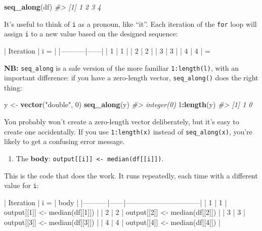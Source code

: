 \documentclass[]{book}
\newenvironment{Shaded}{\begin{snugshade}}{\end{snugshade}}
\newcommand{\CommentTok}[1]{\textcolor[rgb]{0.56,0.35,0.01}{\textit{#1}}}
\newcommand{\DecValTok}[1]{\textcolor[rgb]{0.00,0.00,0.81}{#1}}
\newcommand{\KeywordTok}[1]{\textcolor[rgb]{0.13,0.29,0.53}{\textbf{#1}}}
\newcommand{\NormalTok}[1]{#1}
\newcommand{\OperatorTok}[1]{\textcolor[rgb]{0.81,0.36,0.00}{\textbf{#1}}}
\newcommand{\StringTok}[1]{\textcolor[rgb]{0.31,0.60,0.02}{#1}}
\providecommand{\tightlist}{%
  \setlength{\itemsep}{0pt}\setlength{\parskip}{0pt}}
\begin{document}
\begin{Shaded}
\begin{Highlighting}[]
\KeywordTok{seq_along}\NormalTok{(df)}
\CommentTok{#> [1] 1 2 3 4}
\end{Highlighting}
\end{Shaded}

It's useful to think of \texttt{i} as a pronoun, like ``it''. Each iteration of the \texttt{for} loop will assign \texttt{i} to a new value based on the designed sequence:

\begin{Shaded}
\begin{Highlighting}[]
\NormalTok{| Iteration | i =  |}
\NormalTok{|-----------|------|}
\NormalTok{| 1         | 1    | }
\NormalTok{| 2         | 2    | }
\NormalTok{| 3         | 3    | }
\NormalTok{| 4         | 4    | }
\NormalTok{=}
\end{Highlighting}
\end{Shaded}

\textbf{NB:} \texttt{seq\_along} is a safe version of the more familiar \texttt{1:length(l)}, with an important difference: if you have a zero-length vector, \texttt{seq\_along()} does the right thing:

\begin{Shaded}
\begin{Highlighting}[]
\NormalTok{y <-}\StringTok{ }\KeywordTok{vector}\NormalTok{(}\StringTok{"double"}\NormalTok{, }\DecValTok{0}\NormalTok{)}
\KeywordTok{seq_along}\NormalTok{(y)}
\CommentTok{#> integer(0)}
\DecValTok{1}\OperatorTok{:}\KeywordTok{length}\NormalTok{(y)}
\CommentTok{#> [1] 1 0}
\end{Highlighting}
\end{Shaded}

You probably won't create a zero-length vector deliberately, but it's easy to create one accidentally. If you use \texttt{1:length(x)} instead of \texttt{seq\_along(x)}, you're likely to get a confusing error message.

\begin{enumerate}
\def\labelenumi{\arabic{enumi}.}
\setcounter{enumi}{2}
\tightlist
\item
  The \textbf{body}: \texttt{output{[}{[}i{]}{]}\ \textless{}-\ median(df{[}{[}i{]}{]})}.
\end{enumerate}

This is the code that does the work. It runs repeatedly, each time with a different value for \texttt{i}:

\begin{Shaded}
\begin{Highlighting}[]
\NormalTok{| Iteration | i =  | body                           |}
\NormalTok{|-----------|------|--------------------------------|}
\NormalTok{| 1         | 1    | output[[1]] <- median(df[[1]]) |}
\NormalTok{| 2         | 2    | output[[2]] <- median(df[[2]]) |}
\NormalTok{| 3         | 3    | output[[3]] <- median(df[[3]]) |}
\NormalTok{| 4         | 4    | output[[4]] <- median(df[[4]]) |}
\end{Highlighting}
\end{Shaded}
\end{document}
